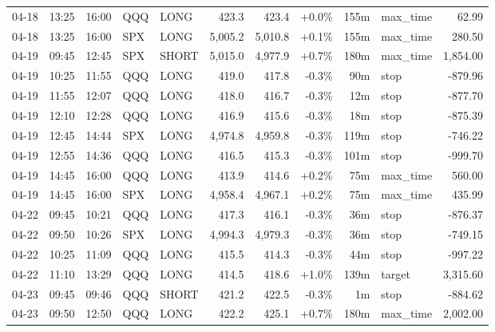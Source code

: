 \documentclass[11pt,a4paper,twoside]{article}
\begin{document}
\begin{center}
\begin{longtable}{>{\color{txtmain}}l l l l l r r r r >{\color{txtmain}}l r}
04-18 & 13:25 & 16:00 & QQQ & LONG & 423.3 & 423.4 & \textcolor{wingreen}{+0.0\%} & 155m & max\_time & \textcolor{wingreen}{62.99} \\
04-18 & 13:25 & 16:00 & SPX & LONG & 5,005.2 & 5,010.8 & \textcolor{wingreen}{+0.1\%} & 155m & max\_time & \textcolor{wingreen}{280.50} \\
04-19 & 09:45 & 12:45 & SPX & SHORT & 5,015.0 & 4,977.9 & \textcolor{wingreen}{+0.7\%} & 180m & max\_time & \textcolor{wingreen}{1,854.00} \\
04-19 & 10:25 & 11:55 & QQQ & LONG & 419.0 & 417.8 & \textcolor{lossred}{-0.3\%} & 90m & stop & \textcolor{lossred}{-879.96} \\
04-19 & 11:55 & 12:07 & QQQ & LONG & 418.0 & 416.7 & \textcolor{lossred}{-0.3\%} & 12m & stop & \textcolor{lossred}{-877.70} \\
04-19 & 12:10 & 12:28 & QQQ & LONG & 416.9 & 415.6 & \textcolor{lossred}{-0.3\%} & 18m & stop & \textcolor{lossred}{-875.39} \\
04-19 & 12:45 & 14:44 & SPX & LONG & 4,974.8 & 4,959.8 & \textcolor{lossred}{-0.3\%} & 119m & stop & \textcolor{lossred}{-746.22} \\
04-19 & 12:55 & 14:36 & QQQ & LONG & 416.5 & 415.3 & \textcolor{lossred}{-0.3\%} & 101m & stop & \textcolor{lossred}{-999.70} \\
04-19 & 14:45 & 16:00 & QQQ & LONG & 413.9 & 414.6 & \textcolor{wingreen}{+0.2\%} & 75m & max\_time & \textcolor{wingreen}{560.00} \\
04-19 & 14:45 & 16:00 & SPX & LONG & 4,958.4 & 4,967.1 & \textcolor{wingreen}{+0.2\%} & 75m & max\_time & \textcolor{wingreen}{435.99} \\
04-22 & 09:45 & 10:21 & QQQ & LONG & 417.3 & 416.1 & \textcolor{lossred}{-0.3\%} & 36m & stop & \textcolor{lossred}{-876.37} \\
04-22 & 09:50 & 10:26 & SPX & LONG & 4,994.3 & 4,979.3 & \textcolor{lossred}{-0.3\%} & 36m & stop & \textcolor{lossred}{-749.15} \\
04-22 & 10:25 & 11:09 & QQQ & LONG & 415.5 & 414.3 & \textcolor{lossred}{-0.3\%} & 44m & stop & \textcolor{lossred}{-997.22} \\
04-22 & 11:10 & 13:29 & QQQ & LONG & 414.5 & 418.6 & \textcolor{wingreen}{+1.0\%} & 139m & target & \textcolor{wingreen}{3,315.60} \\
04-23 & 09:45 & 09:46 & QQQ & SHORT & 421.2 & 422.5 & \textcolor{lossred}{-0.3\%} & 1m & stop & \textcolor{lossred}{-884.62} \\
04-23 & 09:50 & 12:50 & QQQ & LONG & 422.2 & 425.1 & \textcolor{wingreen}{+0.7\%} & 180m & max\_time & \textcolor{wingreen}{2,002.00} \\

\end{longtable}
\end{center}
\end{document}
